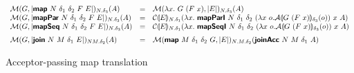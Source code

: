 \begin{figure}
  \begin{displaymath}
    \begin{array}{lcl}
      \semM{G}{\prim{map}~N~\delta_1~\delta_2~F~E}_{N.\delta_3}(A)
      &=& \semM{\lambda x.~G~(F~x)}{E}_{N.\delta_3}(A) %
      \\
      \semM{G}{\prim{mapPar}~N~\delta_1~\delta_2~F~E}_{N.\delta_3}(A)
      &=& \semE{E}_{N.\delta_1}(\lambda x.~\prim{mapParI}~N~\delta_1~\delta_2~(\lambda x~o. \semA{G~(F~x)}_{\delta_3}(o))~x~A)
      \\
      \semM{G}{\prim{mapSeq}~N~\delta_1~\delta_2~F~E}_{N.\delta_3}(A)
      &=& \semE{E}_{N.\delta_1}(\lambda x.~\prim{mapSeqI}~N~\delta_1~\delta_2~(\lambda x~o. \semA{G~(F~x)}_{\delta_3}(o))~x~A)
      \medskip\\

      \semM{G}{\prim{join}~N~M~\delta_1~E}_{NM.\delta_2}(A)
      &=& \semM{\prim{map}~M~\delta_1~\delta_2~G}{E}_{N.M.\delta_2}(\prim{joinAcc}~N~M~\delta_1~A)
      \\
    \end{array}
  \end{displaymath}
  \caption{Acceptor-passing map translation}\label{fig:map-acc-trans}
\end{figure}

